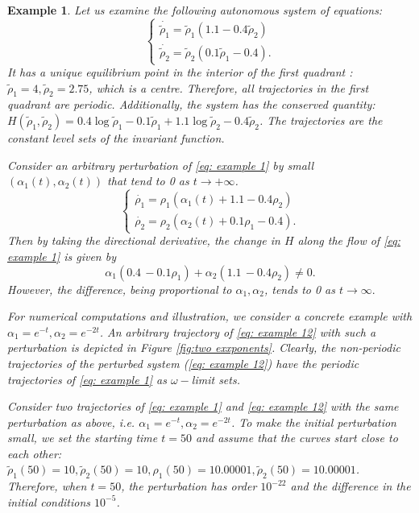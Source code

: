 \documentclass{article}
\newtheorem{example}{Example}[section]
\begin{document}
\begin{example}
Let us examine the following autonomous system of equations:
\begin{equation}
\label{eq: example 1}
    \begin{cases}
      \dot{\widetilde{\rho}_1} = \widetilde{\rho}_1(1.1 - 0.4\widetilde{\rho}_2)\\
      \dot{\widetilde{\rho}_2} = \widetilde{\rho}_2(0.1 \widetilde{\rho}_1-0.4).
    \end{cases}
\end{equation}
It has a unique equilibrium point in the interior of the first quadrant : $\widetilde{\rho}_1 =4, \widetilde{\rho}_2= 2.75 $, which is a centre. Therefore, all trajectories in the first quadrant are periodic. Additionally, the system has the  conserved quantity: $H(\widetilde{\rho}_1, \widetilde{\rho}_2) = 0.4\log \widetilde{\rho}_1 -0.1 \widetilde{\rho}_1 + 1.1 \log \widetilde{\rho}_2  - 0.4 \widetilde{\rho}_2$. The trajectories are the constant level sets of the invariant function. 

Consider an  arbitrary perturbation of \eqref{eq: example 1} by small $(\alpha_1(t), \alpha_2(t))$ that tend to 0 as $t\to+\infty$. 
\begin{equation}
\label{eq: example 12}
    \begin{cases}
      \dot{\rho_1} = \rho_1(\alpha_1(t)+1.1 - 0.4\rho_2)\\
      \dot{\rho_2} = \rho_2(\alpha_2(t)+0.1 \rho_1-0.4).
    \end{cases}
\end{equation}
Then by taking the directional derivative, the change in $H$ along the flow of \eqref{eq: example 1} is given by
\[\alpha_1 (0.4\, -0.1 \rho_1)+\alpha_2 (1.1\, -0.4 \rho_2)\ne 0.\] However, the difference, being proportional to $\alpha_1, \alpha_2$, tends to 0 as $t\to \infty.$ 

For numerical computations and illustration, we consider a concrete example with $\alpha_1 = e^{-t},\alpha_2= e^{-2t}$. An arbitrary trajectory of \eqref{eq: example 12} with such a perturbation  is depicted in Figure \ref{fig:two exxponents}. Clearly, the non-periodic trajectories of the perturbed system (\ref{eq: example 12}) have the periodic trajectories of \eqref{eq: example 1} as $\omega-$limit sets. 

Consider two trajectories of \eqref{eq: example 1} and \eqref{eq: example 12} with the same perturbation as above, i.e. $\alpha_1 = e^{-t},\alpha_2= e^{-2t}$. To make the initial perturbation small, we set the starting  time $t=50$ and assume that the curves start close to each other: $\widetilde{\rho}_1(50) = 10,\widetilde{\rho}_2(50) = 10, \rho_1(50) = 10.00001, \tilde{\rho}_2(50) = 10.00001$. Therefore,  when $t=50$, the perturbation has order  $10^{-22}$ and the difference in the initial conditions  $10^{-5}$.  


\end{example}
\end{document}
